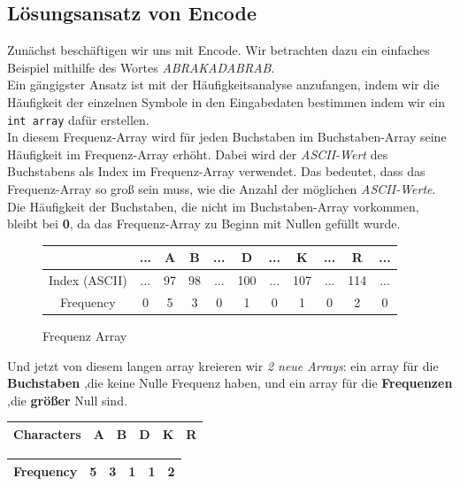 \documentclass[course=erap]{aspdoc}
\begin{document}
\subsection{Lösungsansatz von Encode}\label{Encode}
Zunächst beschäftigen wir uns mit Encode. Wir betrachten dazu ein einfaches Beispiel mithilfe des Wortes \emph{ABRAKADABRAB}. \\
\newline
Ein gängigster Ansatz ist mit der Häufigkeitsanalyse anzufangen, indem wir die Häufigkeit der einzelnen Symbole in den Eingabedaten bestimmen indem wir ein \verb+int array+ dafür erstellen. \\
In diesem Frequenz-Array  wird für jeden Buchstaben im Buchstaben-Array seine Häufigkeit im Frequenz-Array erhöht. Dabei wird der \emph{ASCII-Wert} des Buchstabens als Index im Frequenz-Array verwendet. Das bedeutet, dass das Frequenz-Array so groß sein muss, wie die Anzahl der möglichen \emph{ASCII-Werte}. Die Häufigkeit der Buchstaben, die nicht im Buchstaben-Array vorkommen, bleibt bei \textbf{0}, da das Frequenz-Array zu Beginn mit Nullen gefüllt wurde.\\
\begin{figure}[H]
\centering
\captionsetup{justification=centering}
\begin{table}[H]
\centering

\begin{tabular}{|| c | c | c | c | c | c | c | c | c | c | c ||} 
 \hline
\rowcolor[gray]{0.9}   & ... & A & B & ... & D & ... & K & ... & R & ... \\ [0.5ex]
 \hline
Index (ASCII) & ... & 97 & 98 & ... & 100 & ... & 107 & ... & 114 & ...\\ [0.5ex]
\hline
Frequency & 0 & 5 & 3 & 0 & 1 & 0 & 1 & 0 & 2 & 0\\ [0.5ex]
\hline
\end{tabular}
\end{table}
\caption{Frequenz Array}
\end{figure}
Und jetzt von diesem langen array kreieren wir \emph{2 neue Arrays}: ein array für die \textbf{Buchstaben} ,die keine Nulle Frequenz haben, und ein array für  die \textbf{Frequenzen} ,die \textbf{größer} Null sind.
\begin{enumerate}
\begin{table}[H]
\centering
\item
\begin{tabular}{|| m{} | m{} | m{} | m{} | m{} | m{}||} 
 \hline
Characters & A & B & D & K & R \\ [0.5ex]
\hline
\end{tabular}
\item
\begin{tabular}{|| m{} | m{} | m{} | m{} | m{} | m{}||}  
\hline
Frequency & 5 & 3 & 1 & 1 & 2 \\ [0.5ex]
\hline
\end{tabular}
\end{table}
\end{enumerate}
\end{document}

